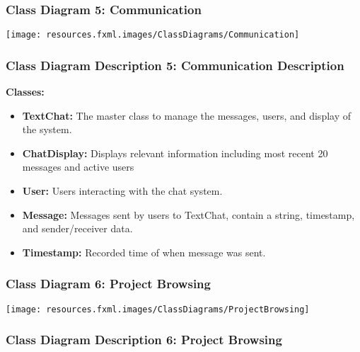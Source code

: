 \documentclass[twoside,letterpaper]{article}
\begin{document}
{\newpage
\subsubsection[Class Diagram 5: Communication]{\rmfamily\bfseries\color{black}
	Class Diagram 5: Communication}
\hypertarget{RefHeading22059017292}{}
\bigskip

\texttt{[image: resources.fxml.images/ClassDiagrams/Communication]}

\newpage
\subsubsection[Class Diagram Description 5: Communication Description]{\rmfamily\bfseries\color{black}
	Class Diagram Description 5: Communication Description}
\hypertarget{RefHeading22059017292}{}

\textbf{Classes:}
\begin{itemize}

	\item \textbf{TextChat:} The master class to manage the messages, users, and display of the system.
	\item \textbf{ChatDisplay:} Displays relevant information including most recent 20 messages and active users
	\item \textbf{User:} Users interacting with the chat system.
	\item \textbf{Message:} Messages sent by users to TextChat, contain a string, timestamp, and sender/receiver data.
	\item \textbf{Timestamp:} Recorded time of when message was sent.
\end{itemize}
\newpage

\subsubsection[Class Diagram 6: Project Browsing]{\rmfamily\bfseries\color{black}
	Class Diagram 6: Project Browsing}
\hypertarget{RefHeading22059017292}{}
\bigskip

\texttt{[image: resources.fxml.images/ClassDiagrams/ProjectBrowsing]}

\newpage

\subsubsection[Class Diagram Description 6: Project Browsing]{\rmfamily\bfseries\color{black}
	Class Diagram Description 6: Project Browsing}
\hypertarget{RefHeading22059017292}{}


}
\end{document}
